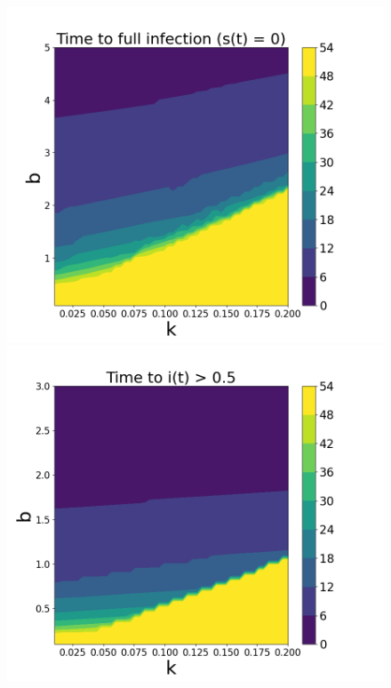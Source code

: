 \documentclass[12pt, reqno]{amsart}
\begin{document}
    \begin{figure}[h]
        \centering
        \begin{minipage}[b]{0.4 \textwidth}
            \includegraphics[width=\textwidth]{phase_transition_full_infection.png}
            \caption{}
            \label{fig:phase_transition_full_infection}
        \end{minipage}
        \hfill
        \begin{minipage}[b]{0.4 \textwidth}
            \includegraphics[width=\textwidth]{phase_transition_outnumber.png}
            \caption{}
            \label{fig:phase_transition_outnumber}
        \end{minipage}
        
    \end{figure}
\end{document}
